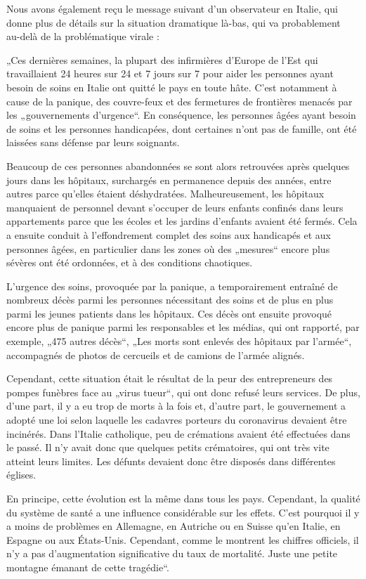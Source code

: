 Nous avons également reçu le message suivant d'un observateur en Italie,
qui donne plus de détails sur la situation dramatique là-bas, qui va
probablement~ au-delà de la problématique virale :

„Ces dernières semaines, la plupart des infirmières d'Europe de l'Est
qui travaillaient 24 heures sur 24 et 7 jours sur 7 pour aider les
personnes ayant besoin de soins en Italie ont quitté le pays en toute
hâte. C'est notamment à cause de la panique, des couvre-feux et des
fermetures de frontières menacés par les „gouvernements d'urgence``. En
conséquence, les personnes âgées ayant besoin de soins et les personnes
handicapées, dont certaines n'ont pas de famille, ont été laissées sans
défense par leurs soignants.

Beaucoup de ces personnes abandonnées se sont alors retrouvées après
quelques jours dans les hôpitaux, surchargés en permanence depuis des
années, entre autres parce qu'elles étaient déshydratées.
Malheureusement, les hôpitaux manquaient de personnel devant s'occuper
de leurs enfants confinés dans leurs appartements parce que les écoles
et les jardins d'enfants avaient été fermés. Cela a ensuite conduit à
l'effondrement complet des soins aux handicapés et aux personnes âgées,
en particulier dans les zones où des „mesures`` encore plus sévères ont
été ordonnées, et à des conditions chaotiques.

L'urgence des soins, provoquée par la panique, a temporairement entraîné
de nombreux décès parmi les personnes nécessitant des soins et de plus
en plus parmi les jeunes patients dans les hôpitaux. Ces décès ont
ensuite provoqué encore plus de panique parmi les responsables et les
médias, qui ont rapporté, par exemple, „475 autres décès``, „Les morts
sont enlevés des hôpitaux par l'armée``, accompagnés de photos de
cercueils et de camions de l'armée alignés.

Cependant, cette situation était le résultat de la peur des
entrepreneurs des pompes funèbres face au „virus tueur``, qui ont donc
refusé leurs services. De plus, d'une part, il y a eu trop de morts à la
fois et, d'autre part, le gouvernement a adopté une loi selon laquelle
les cadavres porteurs du coronavirus devaient être incinérés. Dans
l'Italie catholique, peu de crémations avaient été effectuées dans le
passé. Il n'y avait donc que quelques petits crématoires, qui ont très
vite atteint leurs limites. Les défunts devaient donc être disposés dans
différentes églises.

En principe, cette évolution est la même dans tous les pays. Cependant,
la qualité du système de santé a une influence considérable sur les
effets. C'est pourquoi il y a moins de problèmes en Allemagne, en
Autriche ou en Suisse qu'en Italie, en Espagne ou aux États-Unis.
Cependant, comme le montrent les chiffres officiels, il n'y a pas
d'augmentation significative du taux de mortalité. Juste une petite
montagne émanant de cette tragédie``.


